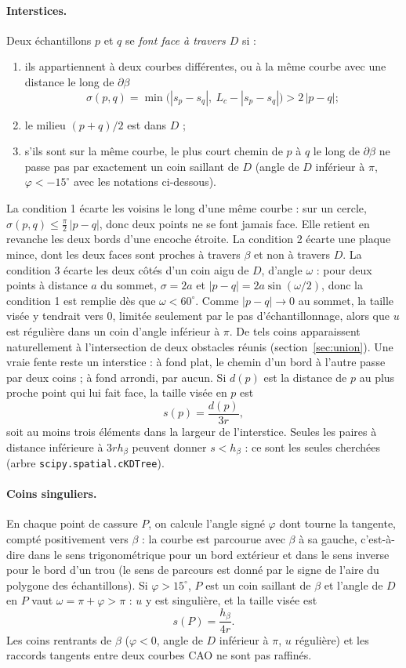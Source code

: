 \documentclass[11pt,a4paper]{article}
\begin{document}
\paragraph{Interstices.} Deux échantillons $p$ et $q$ se \emph{font face à
travers $D$} si :
\begin{enumerate}
  \item ils appartiennent à deux courbes différentes, ou à la même
        courbe avec une distance le long de $\partial\beta$
        \[
        \sigma(p, q) = \min\big(|s_p - s_q|,\ L_c - |s_p - s_q|\big) > 2\,|p - q| ;
        \]
  \item le milieu $(p + q)/2$ est dans $D$ ;
  \item s'ils sont sur la même courbe, le plus court chemin de $p$ à $q$ le
        long de $\partial\beta$ ne passe pas par exactement un coin saillant
        de $D$ (angle de $D$ inférieur à $\pi$, $\varphi < -15^\circ$ avec
        les notations ci-dessous).
\end{enumerate}
La condition 1 écarte les voisins le long d'une même courbe : sur un cercle,
$\sigma(p, q) \le \frac{\pi}{2}\,|p - q|$, donc deux points ne se font
jamais face. Elle retient en revanche les deux bords d'une encoche étroite.
La condition 2 écarte une plaque mince, dont les deux faces sont proches à
travers $\beta$ et non à travers $D$. La condition 3 écarte les deux côtés
d'un coin aigu de $D$, d'angle $\omega$ : pour deux points à distance $a$ du
sommet, $\sigma = 2a$ et $|p - q| = 2a \sin(\omega/2)$, donc la
condition 1 est remplie dès que $\omega < 60^\circ$. Comme $|p - q| \to 0$ au
sommet, la taille visée y tendrait vers $0$, limitée seulement par le pas
d'échantillonnage, alors que $u$ est régulière dans un coin d'angle
inférieur à $\pi$. De tels coins apparaissent naturellement à l'intersection
de deux obstacles réunis (section~\ref{sec:union}). Une vraie fente reste
un interstice : à fond plat, le chemin d'un bord à l'autre passe par deux
coins ; à fond arrondi, par aucun. Si $d(p)$ est la distance de $p$ au
plus proche point qui lui fait face, la taille visée en $p$ est
\[
s(p) = \frac{d(p)}{3 r},
\]
soit au moins trois éléments dans la largeur de l'interstice. Seules les
paires à distance inférieure à $3 r h_\beta$ peuvent donner $s < h_\beta$ :
ce sont les seules cherchées (arbre \texttt{scipy.spatial.cKDTree}).

\paragraph{Coins singuliers.} En chaque point de cassure $P$, on calcule
l'angle signé $\varphi$ dont tourne la tangente, compté positivement vers
$\beta$ : la courbe est parcourue avec $\beta$ à sa gauche, c'est-à-dire dans
le sens trigonométrique pour un bord extérieur et dans le sens inverse pour
le bord d'un trou (le sens de parcours est donné par le signe de l'aire du
polygone des échantillons). Si $\varphi > 15^\circ$, $P$ est un coin saillant de $\beta$
et l'angle de $D$ en $P$ vaut $\omega = \pi + \varphi > \pi$ : $u$ y est
singulière, et la taille visée est
\[
s(P) = \frac{h_\beta}{4 r}.
\]
Les coins rentrants de $\beta$ ($\varphi < 0$, angle de $D$ inférieur à
$\pi$, $u$ régulière) et les raccords tangents entre deux courbes CAO ne sont
pas raffinés.
\end{document}
